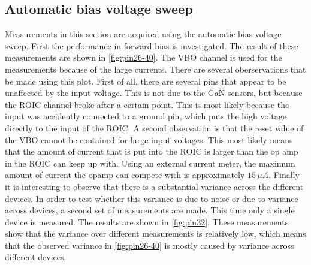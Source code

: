 \subsection{Automatic bias voltage sweep}\label{ssec:automatic_bias_voltage_sweep}
Measurements in this section are acquired using the automatic bias voltage sweep. First the performance in forward bias is investigated. The result of these measurements are shown in \cref{fig:pin26-40}. The VBO channel is used for the measurements because of the large currents. There are several oberservations that be made using this plot. First of all, there are several pins that appear to be unaffected by the input voltage. This is not due to the GaN sensors, but because the ROIC channel broke after a certain point. This is most likely because the input was accidently connected to a ground pin, which puts the high voltage directly to the input of the ROIC. A second observation is that the reset value of the VBO cannot be contained for large input voltages. This most likely means that the amount of current that is put into the ROIC is larger than the op amp in the ROIC can keep up with. Using an external current meter, the maximum amount of current the opamp can compete with is approximately $15\,\mu A$. Finally it is interesting to observe that there is a substantial variance across the different devices. In order to test whether this variance is due to noise or due to variance across devices, a second set of measurements are made. This time only a single device is measured. The results are shown in \cref{fig:pin32}. These measurements show that the variance over different measurements is relatively low, which means that the observed variance in \cref{fig:pin26-40} is mostly caused by variance across different devices.


